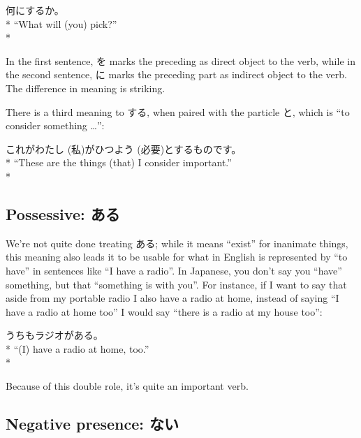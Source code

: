\documentclass[11pt, b5paper, twoside, openright, onecolumn]{book}
\makeatletter
\newcommand*{\rubystack}[2]{{\relscale{0.5}%
  \begin{tabular}[b]{@{}c@{}}%
    {#1}\\%
   {\textscale{2}{#2}}%
  \end{tabular}}%
}
\DeclareRobustCommand*{\ruby}[2]{%
  \mbox{%
    \setlength{\parskip}{0ex}%
    \BeginAccSupp{method=pdfstringdef,ActualText={#1}}%
      \rubystack{\phantom{#2}}{#1}%
      \llap{%
        \rubystack{#2}{\phantom{#1}}%
      }%
    \EndAccSupp{}%
  }%
}
\renewcommand*{\ruby}[2]{#2 (#1)}%
\newenvironment{exampleblock}{
\setlength{\parindent}{0.6in}
\begin{minipage}[t]{\dimexpr\textwidth-\parindent}}
{\end{minipage}}
\makeatother
\begin{document}
\begin{exampleblock}
何にするか。 \\* 
“What will (you) pick?” \\* 
\end{exampleblock}
\vspace{0.2cm}

In the first sentence‚ を marks the preceding as direct object to the verb‚ while in the second sentence‚ に marks the preceding part as indirect object to the verb. The difference in meaning is striking.

There is a third meaning to する‚ when paired with the particle と‚ which is “to consider something …”:

\vspace{0.4cm}
\begin{exampleblock}
これが\ruby{私}{わたし}が\ruby{必要}{ひつよう}とするものです。 \\* 
“These are the things (that) I consider important.” \\* 
\end{exampleblock}
\subsection{Possessive: ある}


We’re not quite done treating ある; while it means “exist” for inanimate things‚ this meaning also leads it to be usable for what in English is represented by “to have” in sentences like “I have a radio”. In Japanese‚ you don’t say you “have” something‚ but that “something is with you”. For instance‚ if I want to say that aside from my portable radio I also have a radio at home‚ instead of saying “I have a radio at home too” I would say “there is a radio at my house too”:

\vspace{0.4cm}
\begin{exampleblock}
うちもラジオがある。 \\* 
“(I) have a radio at home‚ too.” \\* 
\end{exampleblock}
\vspace{0.2cm}

Because of this double role‚ it’s quite an important verb.

\subsection{Negative presence: ない}
\end{document}
